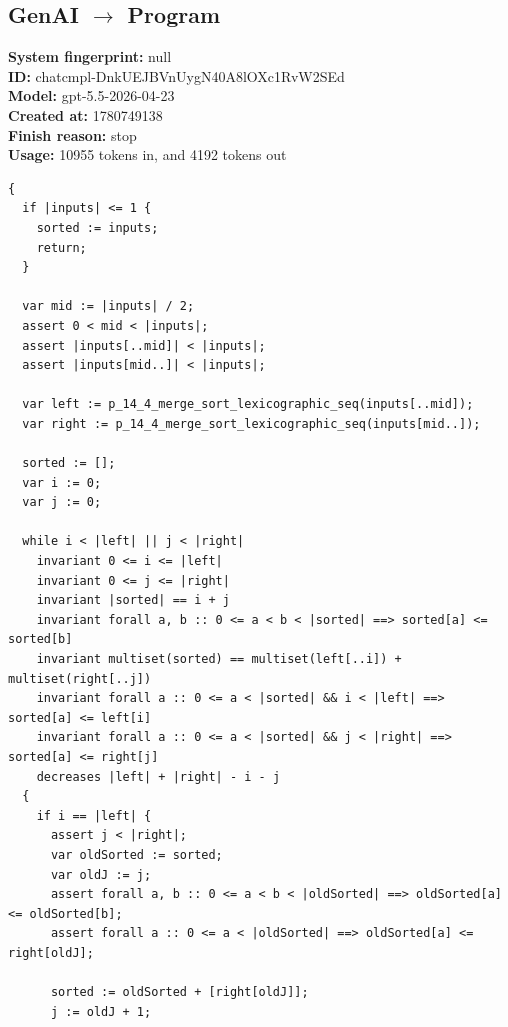\documentclass{article}
\begin{document}
\subsection*{GenAI $\rightarrow$ Program}
\textbf{System fingerprint: }null
\\\textbf{ID: }chatcmpl-DnkUEJBVnUygN40A8lOXc1RvW2SEd
\\\textbf{Model: }gpt-5.5-2026-04-23
\\\textbf{Created at: }1780749138
\\\textbf{Finish reason: }stop
\\\textbf{Usage: }10955 tokens in, and 4192 tokens out
\begin{lstlisting}
{
  if |inputs| <= 1 {
    sorted := inputs;
    return;
  }

  var mid := |inputs| / 2;
  assert 0 < mid < |inputs|;
  assert |inputs[..mid]| < |inputs|;
  assert |inputs[mid..]| < |inputs|;

  var left := p_14_4_merge_sort_lexicographic_seq(inputs[..mid]);
  var right := p_14_4_merge_sort_lexicographic_seq(inputs[mid..]);

  sorted := [];
  var i := 0;
  var j := 0;

  while i < |left| || j < |right|
    invariant 0 <= i <= |left|
    invariant 0 <= j <= |right|
    invariant |sorted| == i + j
    invariant forall a, b :: 0 <= a < b < |sorted| ==> sorted[a] <= sorted[b]
    invariant multiset(sorted) == multiset(left[..i]) + multiset(right[..j])
    invariant forall a :: 0 <= a < |sorted| && i < |left| ==> sorted[a] <= left[i]
    invariant forall a :: 0 <= a < |sorted| && j < |right| ==> sorted[a] <= right[j]
    decreases |left| + |right| - i - j
  {
    if i == |left| {
      assert j < |right|;
      var oldSorted := sorted;
      var oldJ := j;
      assert forall a, b :: 0 <= a < b < |oldSorted| ==> oldSorted[a] <= oldSorted[b];
      assert forall a :: 0 <= a < |oldSorted| ==> oldSorted[a] <= right[oldJ];

      sorted := oldSorted + [right[oldJ]];
      j := oldJ + 1;


\end{lstlisting}
\end{document}
